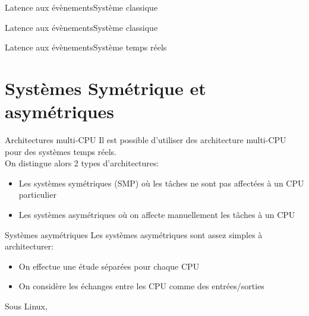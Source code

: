 \begin{frame}{Latence aux évènements}{Système classique}
  \begin{center}
  \end{center}
\end{frame}

\begin{frame}{Latence aux évènements}{Système classique}
  \begin{center}
  \end{center}
\end{frame}

\begin{frame}{Latence aux évènements}{Système temps réels}
  \begin{center}
  \end{center}
\end{frame}

\section{Systèmes Symétrique et asymétriques}

\begin{frame}{Architectures multi-CPU}
Il est possible d'utiliser des architecture multi-CPU pour des systèmes temps réels.\\
On distingue alors 2 types d'architectures:
\begin{itemize} 
\item Les systèmes symétriques (SMP) où les tâches ne sont pas affectées à un CPU particulier
\item Les systèmes asymétriques où on affecte manuellement les tâches à un CPU
\end{itemize} 
\end{frame}

\begin{frame}{Systèmes asymétriques}
Les systèmes asymétriques sont assez simples à architecturer:
\begin{itemize} 
\item On effectue une étude séparées pour chaque CPU
\item On considère les échanges entre les CPU comme des entrées/sorties
\end{itemize} 
Sous Linux, 
\end{frame} 

